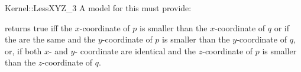 \begin{ccRefFunctionObjectConcept}{Kernel::LessXYZ_3}
A model for this must provide:


{returns true iff the $x$-coordinate of $p$ is smaller than the
$x$-coordinate of $q$ or if the are the same and 
the $y$-coordinate of $p$ is smaller than the $y$-coordinate of $q$, or,
if both $x$- and $y$- coordinate are identical and
the $z$-coordinate of $p$ is smaller than the $z$-coordinate of $q$.}

\ccSeeAlso
{}\\

\end{ccRefFunctionObjectConcept}
